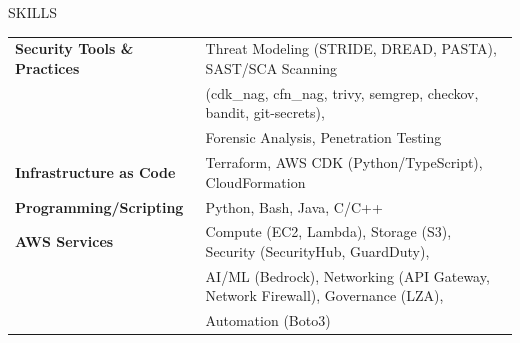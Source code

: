 \documentclass{resume} %
\begin{document}
\begin{rSection}{SKILLS}

\begin{tabular}{ @{} >{\bfseries}l @{\hspace{3ex}} l }
Security Tools \& Practices & Threat Modeling (STRIDE, DREAD, PASTA), SAST/SCA Scanning \\
& (cdk\_nag, cfn\_nag, trivy, semgrep, checkov, bandit, git-secrets), \\
& Forensic Analysis, Penetration Testing \\
Infrastructure as Code & Terraform, AWS CDK (Python/TypeScript), CloudFormation \\
Programming/Scripting & Python, Bash, Java, C/C++ \\
AWS Services & Compute (EC2, Lambda), Storage (S3), Security (SecurityHub, GuardDuty), \\
& AI/ML (Bedrock), Networking (API Gateway, Network Firewall), Governance (LZA), \\
& Automation (Boto3) \\
\end{tabular}\\
\end{rSection}
\end{document}
